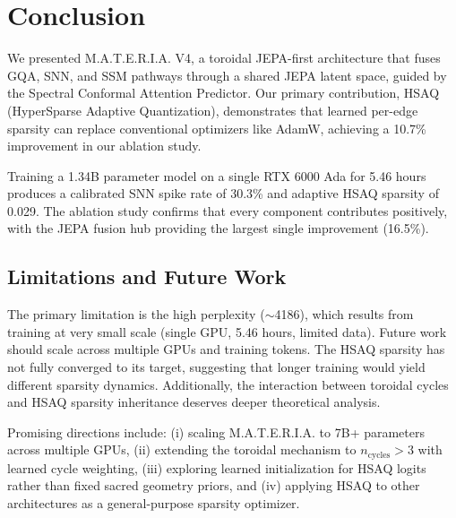 \documentclass[conference]{IEEEtran}
\newcommand{\materia}{\textsc{M.A.T.E.R.I.A.}}
\begin{document}
\section{Conclusion}

We presented \materia{} V4, a toroidal JEPA-first architecture that fuses GQA, SNN, and SSM pathways through a shared JEPA latent space, guided by the Spectral Conformal Attention Predictor. Our primary contribution, HSAQ (HyperSparse Adaptive Quantization), demonstrates that learned per-edge sparsity can replace conventional optimizers like AdamW, achieving a 10.7\% improvement in our ablation study.

Training a 1.34B parameter model on a single RTX 6000 Ada for 5.46 hours produces a calibrated SNN spike rate of 30.3\% and adaptive HSAQ sparsity of 0.029. The ablation study confirms that every component contributes positively, with the JEPA fusion hub providing the largest single improvement (16.5\%).

\subsection{Limitations and Future Work}

The primary limitation is the high perplexity ($\sim$4186), which results from training at very small scale (single GPU, 5.46 hours, limited data). Future work should scale across multiple GPUs and training tokens. The HSAQ sparsity has not fully converged to its target, suggesting that longer training would yield different sparsity dynamics. Additionally, the interaction between toroidal cycles and HSAQ sparsity inheritance deserves deeper theoretical analysis.

Promising directions include: (i) scaling \materia{} to 7B+ parameters across multiple GPUs, (ii) extending the toroidal mechanism to $n_{\text{cycles}} > 3$ with learned cycle weighting, (iii) exploring learned initialization for HSAQ logits rather than fixed sacred geometry priors, and (iv) applying HSAQ to other architectures as a general-purpose sparsity optimizer.
\end{document}
